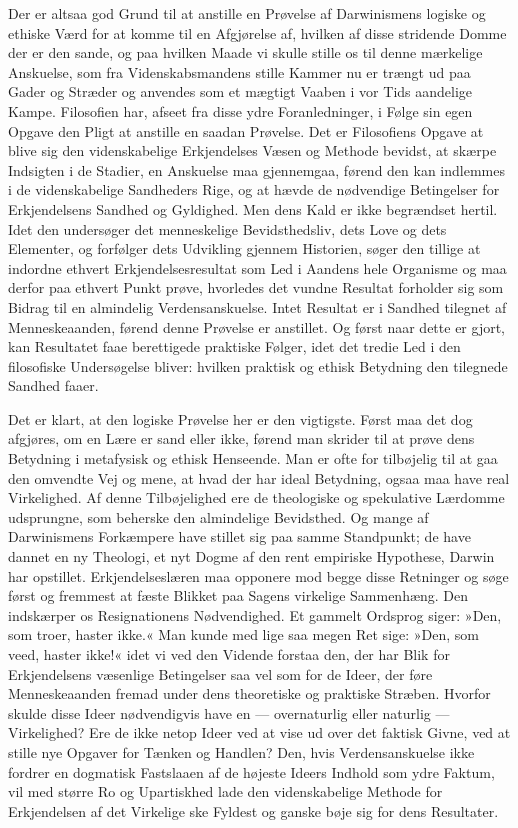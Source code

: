 \documentclass[12pt,a4paper]{article}
\begin{document}
Der er altsaa god Grund til at anstille en Prøvelse af Darwinismens
logiske og ethiske Værd for at komme til en Afgjørelse af, hvilken af
disse stridende Domme der er den sande, og paa hvilken Maade vi skulle
stille os til denne mærkelige Anskuelse, som fra Videnskabsmandens
stille Kammer nu er trængt ud paa Gader og Stræder og anvendes som et
mægtigt Vaaben i vor Tids aandelige Kampe. Filosofien har, afseet fra
disse ydre Foranledninger, i Følge sin egen Opgave den Pligt at anstille
en saadan Prøvelse. Det er Filosofiens Opgave at blive sig den
videnskabelige Erkjendelses Væsen og Methode bevidst, at skærpe Indsigten
i de Stadier, en Anskuelse maa gjennemgaa, førend den kan indlemmes i de
videnskabelige Sandheders Rige, og at hævde de nødvendige Betingelser
for Erkjendelsens Sandhed og Gyldighed. Men dens Kald er ikke begrændset
hertil. Idet den undersøger det menneskelige Bevidsthedsliv, dets Love
og dets Elementer, og forfølger dets Udvikling gjennem Historien, søger
den tillige at indordne ethvert Erkjendelsesresultat som Led i Aandens
hele Organisme og maa derfor paa ethvert Punkt prøve, hvorledes det
vundne Resultat forholder sig som Bidrag til en almindelig
Verdensanskuelse. Intet Resultat er i Sandhed tilegnet af Menneskeaanden,
førend denne Prøvelse er anstillet. Og først naar dette er gjort, kan
Resultatet faae berettigede praktiske Følger, idet det tredie Led i den
filosofiske Undersøgelse bliver: hvilken praktisk og ethisk Betydning
den tilegnede Sandhed faaer.

Det er klart, at den logiske Prøvelse her er den vigtigste. Først maa
det dog afgjøres, om en Lære er sand eller ikke, førend man skrider til
at prøve dens Betydning i metafysisk og ethisk Henseende. Man er ofte
for tilbøjelig til at gaa den omvendte Vej og mene, at hvad der har
ideal Betydning, ogsaa maa have real Virkelighed. Af denne Tilbøjelighed
ere de theologiske og spekulative Lærdomme udsprungne, som beherske den
almindelige Bevidsthed. Og mange af Darwinismens Forkæmpere have stillet
sig paa samme Standpunkt; de have dannet en ny Theologi, et nyt Dogme af
den rent empiriske Hypothese, Darwin har opstillet. Erkjendelseslæren maa
opponere mod begge disse Retninger og søge først og fremmest at fæste
Blikket paa Sagens virkelige Sammenhæng. Den indskærper os Resignationens
Nødvendighed. Et gammelt Ordsprog siger: »Den, som troer, haster ikke.«
Man kunde med lige saa megen Ret sige: »Den, som veed, haster ikke!«
idet vi ved den Vidende forstaa den, der har Blik for Erkjendelsens
væsenlige Betingelser saa vel som for de Ideer, der føre Menneskeaanden
fremad under dens theoretiske og praktiske Stræben. Hvorfor skulde disse
Ideer nødvendigvis have en --- overnaturlig eller naturlig --- Virkelighed?
Ere de ikke netop Ideer ved at vise ud over det faktisk Givne, ved at
stille nye Opgaver for Tænken og Handlen? Den, hvis Verdensanskuelse
ikke fordrer en dogmatisk Fastslaaen af de højeste Ideers Indhold som
ydre Faktum, vil med større Ro og Upartiskhed lade den videnskabelige
Methode for Erkjendelsen af det Virkelige ske Fyldest og ganske bøje
sig for dens Resultater.
\end{document}
